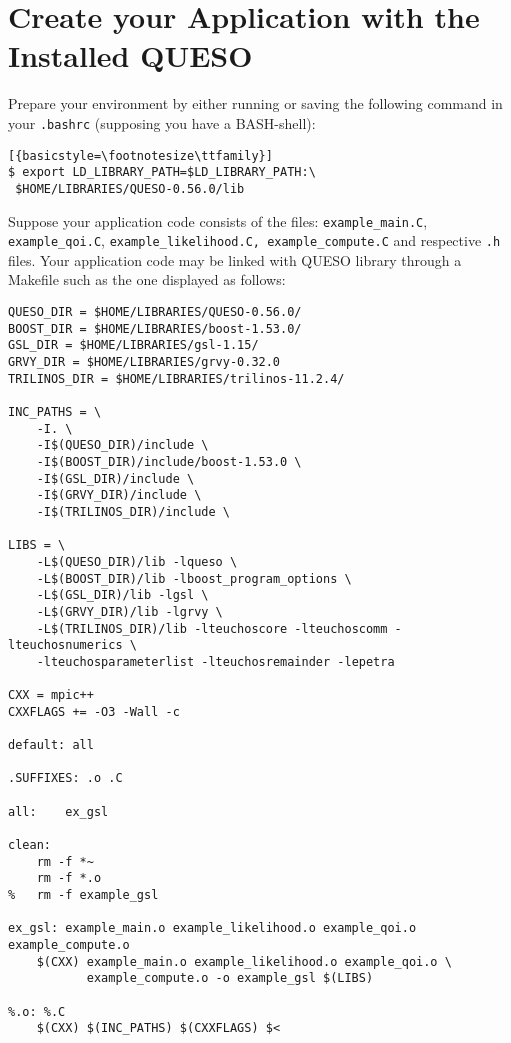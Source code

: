 \section{Create your Application with the Installed QUESO} \label{sc-use-queso}

Prepare your environment by either running or saving the following command in
your \verb+.bashrc+ (supposing you have a BASH-shell):
\begin{lstlisting}[{basicstyle=\footnotesize\ttfamily}]
$ export LD_LIBRARY_PATH=$LD_LIBRARY_PATH:\
 $HOME/LIBRARIES/QUESO-0.56.0/lib
\end{lstlisting}



Suppose your application code consists of the files:  \verb+example_main.C+,
\verb+example_qoi.C+,  \verb+example_likelihood.C, example_compute.C+ and
respective \verb+.h+ files. Your application code may be linked with QUESO
library through a Makefile such as the one displayed as follows:

\begin{lstlisting}[basicstyle={\footnotesize\ttfamily},deletekeywords={export,rm}]
QUESO_DIR = $HOME/LIBRARIES/QUESO-0.56.0/
BOOST_DIR = $HOME/LIBRARIES/boost-1.53.0/
GSL_DIR = $HOME/LIBRARIES/gsl-1.15/
GRVY_DIR = $HOME/LIBRARIES/grvy-0.32.0
TRILINOS_DIR = $HOME/LIBRARIES/trilinos-11.2.4/

INC_PATHS = \
	-I. \
	-I$(QUESO_DIR)/include \
	-I$(BOOST_DIR)/include/boost-1.53.0 \
	-I$(GSL_DIR)/include \
	-I$(GRVY_DIR)/include \
	-I$(TRILINOS_DIR)/include \

LIBS = \
	-L$(QUESO_DIR)/lib -lqueso \
	-L$(BOOST_DIR)/lib -lboost_program_options \
	-L$(GSL_DIR)/lib -lgsl \
	-L$(GRVY_DIR)/lib -lgrvy \
	-L$(TRILINOS_DIR)/lib -lteuchoscore -lteuchoscomm -lteuchosnumerics \
	-lteuchosparameterlist -lteuchosremainder -lepetra

CXX = mpic++
CXXFLAGS += -O3 -Wall -c

default: all

.SUFFIXES: .o .C

all:	ex_gsl

clean:
	rm -f *~
	rm -f *.o
% 	rm -f example_gsl

ex_gsl: example_main.o example_likelihood.o example_qoi.o example_compute.o
	$(CXX) example_main.o example_likelihood.o example_qoi.o \
	       example_compute.o -o example_gsl $(LIBS)

%.o: %.C
	$(CXX) $(INC_PATHS) $(CXXFLAGS) $<
\end{lstlisting}
%

